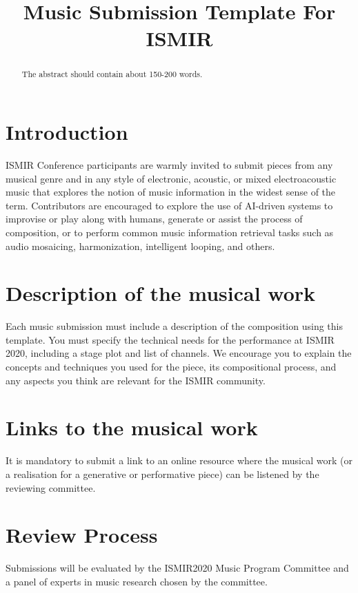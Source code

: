 \documentclass{article}
\title{Music Submission Template For ISMIR \conferenceyear}
\begin{document}
%
\maketitle
%
\begin{abstract}

The abstract should contain about 150-200 words.
\end{abstract}
%
\section{Introduction}\label{sec:introduction}
ISMIR Conference participants are warmly invited to submit pieces from any musical genre and in any style of electronic, acoustic, or mixed electroacoustic music that explores the notion of music information in the widest sense of the term. Contributors are encouraged to explore the use of AI-driven systems to improvise or play along with humans, generate or assist the process of composition, or to perform common music information retrieval tasks such as audio mosaicing, harmonization, intelligent looping, and others.

\section{Description of the musical work}

Each music submission must include a description of the composition using this template.  You must specify the technical needs for the performance at ISMIR 2020, including a stage plot and list of channels. We encourage you to explain the concepts and techniques you used for the piece, its compositional process, and any aspects you think are relevant for the ISMIR community.

 



\section{Links to the musical work}
It is mandatory to submit a link to an online resource where the musical work (or a realisation for a generative or performative piece) can be listened by the reviewing committee. 

\section{Review Process}

Submissions will be evaluated by the ISMIR2020 Music Program Committee and a panel of experts in music research chosen by the committee.
\end{document}
